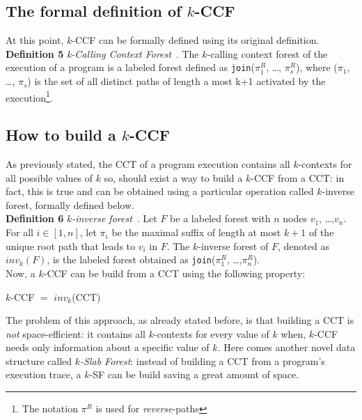 \documentclass[a4paper,10pt]{report}
\begin{document}
\subsection{The formal definition of $k$-CCF}

At this point, $k$-CCF can be formally defined using its original definition.\\

\textbf{Definition 5} \emph{k-Calling Context Forest}~\cite{kccf}. The $k$-calling context
forest of the execution of a program is a labeled forest defined as 
\texttt{join}($\pi_1^R$, \ldots, $\pi_s^R$), where ($\pi_1$, \ldots, $\pi_s$) is the set of
all distinct paths of length a most k+1 activated by the execution\footnote{The notation $\pi^R$ is used for \emph{reverse}-paths}.

\subsection{How to build a $k$-CCF}

As previously stated, the CCT of a program execution contains all $k$-contexts for
all possible values of $k$ so, should exist a way to build a $k$-CCF from a CCT: in fact, this is true and can be obtained using a particular operation called $k$-inverse forest, formally defined below.\\

\textbf{Definition 6} \emph{$k$-inverse forest}~\cite{kccf}. Let $F$ be a labeled forest with $n$ nodes
$v_1$, \ldots ,$v_n$. For all $i \in [1,n]$, let $\pi_i$ be the maximal suffix of length at most $k+1$ of the unique root path that leads to $v_i$ in $F$. The $k$-inverse forest of $F$, denoted as $inv_k(F)$, is the labeled forest obtained as \texttt{join}($\pi_1^R$, \ldots ,$\pi_n^R$).\\[20pt]
Now, a $k$-CCF can be build from a CCT using the following property:
\begin{center}
$k$-CCF $=$ $inv_k$(CCT)
\end{center}

\noindent
The problem of this approach, as already stated before, is that building a CCT 
is \emph{not} space-efficient: it contains all $k$-contexts for every value of $k$ when,
$k$-CCF needs only information about a specific value of $k$. 
Here comes another novel data structure called \emph{$k$-Slab Forest}: 
instead of building a CCT from a program's execution trace, a $k$-SF can be build saving a great amount of space.\\
\end{document}
